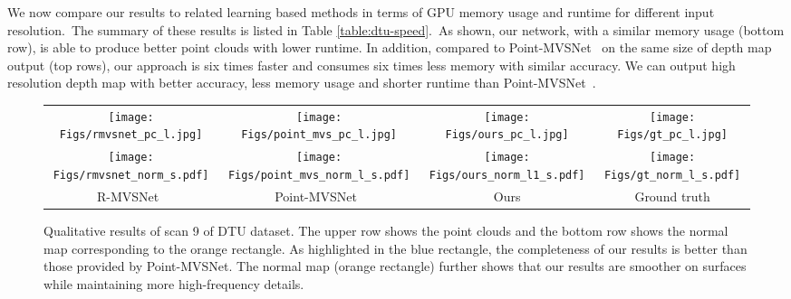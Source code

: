 We now compare our results to related learning based methods in terms of GPU memory usage and runtime for different input resolution.~The summary of these results is listed in Table \ref{table:dtu-speed}.~As shown, our network, with a similar memory usage (bottom row), is able to produce better point clouds with  lower runtime. In addition, compared to Point-MVSNet~\cite{chen2019point} on the same size of depth map output (top rows), our approach is six times faster and consumes six times less memory  with similar accuracy. We can output high resolution depth map with better accuracy, less memory usage and shorter runtime than Point-MVSNet~\cite{chen2019point}.

  \begin{figure*}[!t]
    \begin{center}
    \setlength\tabcolsep{1pt}
    \begin{tabular}{cccc}
          \texttt{[image: Figs/rmvsnet\_pc\_l.jpg]}
          & \texttt{[image: Figs/point\_mvs\_pc\_l.jpg]}
          & \texttt{[image: Figs/ours\_pc\_l.jpg]}
          & \texttt{[image: Figs/gt\_pc\_l.jpg]}\\
          \texttt{[image: Figs/rmvsnet\_norm\_s.pdf]}
          & \texttt{[image: Figs/point\_mvs\_norm\_l\_s.pdf]}
          & \texttt{[image: Figs/ours\_norm\_l1\_s.pdf]}
          & \texttt{[image: Figs/gt\_norm\_l\_s.pdf]}\\
          R-MVSNet~\cite{yao2019recurrent} & Point-MVSNet~\cite{chen2019point} & Ours & Ground truth
    \end{tabular}
    \end{center}
    \vspace{-0.5cm}
    \caption{Qualitative results of scan 9 of DTU dataset. The upper row shows the point clouds and the bottom row shows the normal map corresponding to the orange rectangle. As highlighted in the blue rectangle, the completeness of our results is better than those provided by Point-MVSNet\cite{chen2019point}. The normal map (orange rectangle) further shows that our results are smoother on surfaces while maintaining more high-frequency details. 
    }
    \label{fig:normDTU}
    \vspace{-0.1cm}
\end{figure*}
 
